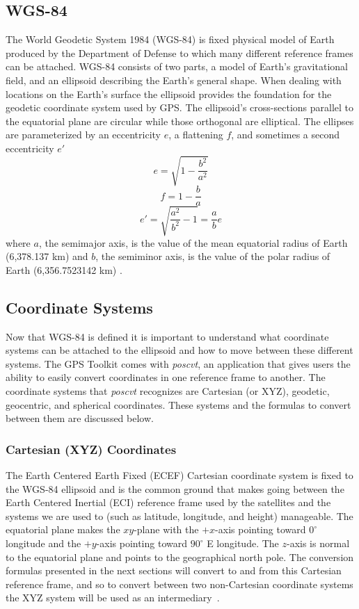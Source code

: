 \subsection{WGS-84}
The World Geodetic System 1984 (WGS-84) is fixed physical model of Earth produced by the Department of Defense to which many different reference frames can be attached. WGS-84 consists of two parts, a model of Earth's gravitational field, and an ellipsoid describing the Earth's general shape. When dealing with locations on the Earth's surface the ellipsoid provides the foundation for the geodetic coordinate system used by GPS. The ellipsoid's cross-sections parallel to the equatorial plane are circular while those orthogonal are elliptical. The ellipses are parameterized by an eccentricity $e$, a flattening $f$, and sometimes a second eccentricity $e'$
\[e=\sqrt{1-\frac{b^{2}}{a^{2}}}\]
\[f=1-\frac{b}{a}\]
\[e'=\sqrt{\frac{a^{2}}{b^{2}}-1}=\frac{a}{b}e\]
where $a$, the semimajor axis, is the value of the mean equatorial radius of Earth (6,378.137 km) and $b$, the semiminor axis, is the value of the polar radius of Earth (6,356.7523142 km) \cite[pp. 25-26]{kaplan:ugpspa}.
\subsection{Coordinate Systems}
Now that WGS-84 is defined it is important to understand what coordinate systems can be attached to the ellipsoid and how to move between these different systems. The GPS Toolkit comes with \emph{poscvt}, an application that gives users the ability to easily convert coordinates in one reference frame to another. The coordinate 
systems that \emph{poscvt} recognizes are Cartesian (or XYZ), geodetic, geocentric, and spherical coordinates. These systems and the formulas to convert between them are discussed below.
\subsubsection{Cartesian (XYZ) Coordinates}
The Earth Centered Earth Fixed (ECEF) Cartesian coordinate system is fixed to the WGS-84 ellipsoid and is the common ground that makes going between the Earth Centered Inertial (ECI) reference frame used by the satellites and the systems we are used to (such as latitude, longitude, and height) manageable. The equatorial plane makes the $xy$-plane with the $+x$-axis pointing toward $0^{\circ}$ longitude and the $+y$-axis pointing toward $90^{\circ}$ E longitude. The $z$-axis is normal to the equatorial plane and points to the geographical north pole. The conversion formulas presented in the next sections will convert to and from this Cartesian reference frame, and so to convert between two non-Cartesian coordinate systems the XYZ system will be used as an intermediary~\cite[p. 24]{kaplan:ugpspa}.
